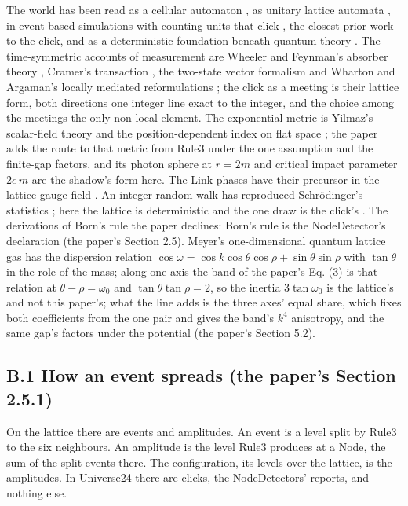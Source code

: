 \documentclass[pdflatex,sn-mathphys-num]{sn-jnl}
\theoremstyle{thmstyleone}
\begin{document}
The world has been read as a cellular automaton \cite{wolfram}\cite{fredkin}, as unitary lattice automata \cite{arrighi}, in event-based simulations with counting units that click \cite{deraedt}, the closest prior work to the click, and as a deterministic foundation beneath quantum theory \cite{thooft}. The time-symmetric accounts of measurement are Wheeler and Feynman's absorber theory \cite{wheeler}, Cramer's transaction \cite{cramer}, the two-state vector formalism \cite{vaidman} and Wharton and Argaman's locally mediated reformulations \cite{wharton}; the click as a meeting is their lattice form, both directions one integer line exact to the integer, and the choice among the meetings the only non-local element. The exponential metric is Yilmaz's scalar-field theory \cite{yilmaz} and the position-dependent index on flat space \cite{dicke}\cite{puthoff}; the paper adds the route to that metric from Rule3 under the one assumption and the finite-gap factors, and its photon sphere at $r = 2m$ and critical impact parameter $2e\,m$ \cite[Section 7]{boonserm} are the shadow's form here. The Link phases have their precursor in the lattice gauge field \cite{wilson}. An integer random walk has reproduced Schr\"odinger's statistics \cite{sciarretta}; here the lattice is deterministic and the one draw is the click's \cite{bohm}\cite{philippidis}. The derivations of Born's rule \cite{gleason}\cite{deutsch}\cite{zurek} the paper declines: Born's rule is the NodeDetector's declaration (the paper's Section 2.5). Meyer's one-dimensional quantum lattice gas \cite{meyer1997} has the dispersion relation $\cos\omega = \cos k\cos\theta\cos\rho + \sin\theta\sin\rho$ with $\tan\theta$ in the role of the mass; along one axis the band of the paper's Eq. (3) is that relation at $\theta - \rho = \omega_0$ and $\tan\theta\tan\rho = 2$, so the inertia $3\tan\omega_0$ is the lattice's and not this paper's; what the line adds is the three axes' equal share, which fixes both coefficients from the one pair and gives the band's $k^4$ anisotropy, and the same gap's factors under the potential (the paper's Section 5.2).

\subsection*{B.1 How an event spreads (the paper's Section 2.5.1)}

On the lattice there are events and amplitudes. An event is a level split by Rule3 to the six neighbours. An amplitude is the level Rule3 produces at a Node, the sum of the split events there. The configuration, its levels over the lattice, is the amplitudes. In Universe24 there are clicks, the NodeDetectors' reports, and nothing else.
\end{document}
